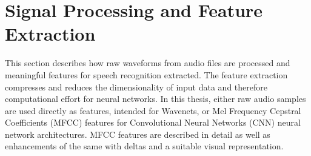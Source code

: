 
\chapter{Signal Processing and Feature Extraction}\label{sec:signal}
This section describes how raw waveforms from audio files are processed and meaningful features for speech recognition extracted.
The feature extraction compresses and reduces the dimensionality of input data and therefore computational effort for neural networks.
In this thesis, either raw audio samples are used directly as features, intended for Wavenets, or Mel Frequency Cepstral Coefficients (MFCC) features for Convolutional Neural Networks (CNN) neural network architectures.
MFCC features are described in detail as well as enhancements of the same with deltas and a suitable visual representation.




